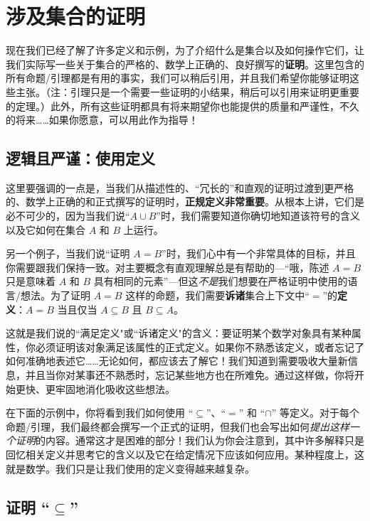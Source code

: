 \section{涉及集合的证明}\label{sec:section3.9}

现在我们已经了解了许多定义和示例，为了介绍什么是集合以及如何操作它们，让我们实际写一些关于集合的严格的、数学上正确的、良好撰写的\textbf{证明}。这里包含的所有命题/引理都是有用的事实，我们可以稍后引用，并且我们希望你能够证明这些主张。（注：引理只是一个需要一些证明的小结果，稍后可以引用来证明更重要的定理。）此外，所有这些证明都具有将来期望你也能提供的质量和严谨性，不久的将来……如果你愿意，可以用此作为指导！

\subsection{逻辑且严谨：使用定义}

这里要强调的一点是，当我们从描述性的、``冗长的''和直观的证明过渡到更严格的、数学上正确的和正式撰写的证明时，\textbf{正规定义非常重要}。从根本上讲，它们是必不可少的，因为当我们说``$A \cup B$''时，我们需要知道你确切地知道该符号的含义以及它如何在集合 $A$ 和 $B$ 上运行。

另一个例子，当我们说``证明 $A = B$''时，我们心中有一个非常具体的目标，并且你需要跟我们保持一致。对主要概念有直观理解总是有帮助的---``哦，陈述 $A = B$ 只是意味着 $A$ 和 $B$ 具有相同的元素''---但这\emph{不是}我们想要在严格证明中使用的语言/想法。为了证明 $A = B$ 这样的命题，我们需要\textbf{诉诸}集合上下文中``$=$''的\textbf{定义}：$A = B$ 当且仅当 $A \subseteq B$ 且 $B \subseteq A$。

这就是我们说的``满足定义"或``诉诸定义"的含义：要证明某个数学对象具有某种属性，你必须证明该对象满足该属性的正式定义。如果你不熟悉该定义，或者忘记了如何准确地表述它……无论如何，都应该去了解它！我们知道到需要吸收大量新信息，并且当你对某事还不熟悉时，忘记某些地方也在所难免。通过这样做，你将开始更快、更牢固地消化吸收这些想法。

在下面的示例中，你将看到我们如何使用 ``$\subseteq$''、``$=$'' 和 ``$\cap$'' 等定义。对于每个命题/引理，我们最终都会撰写一个正式的证明，但我们也会写出如何\emph{提出这样一个证明}的内容。通常这才是困难的部分！我们认为你会注意到，其中许多解释只是回忆相关定义并思考它的含义以及它在给定情况下应该如何应用。某种程度上，这就是数学。我们只是让我们使用的定义变得越来越复杂。

\subsection{证明 ``$\subseteq$''}

